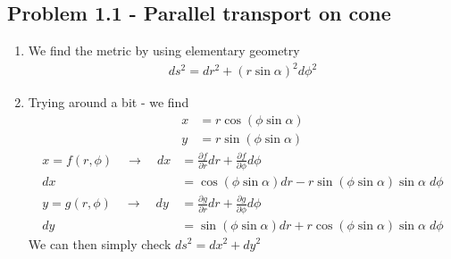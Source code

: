 \documentclass[10pt,a4paper]{book}
\theoremstyle{definition}
\begin{document}
\subsection{Problem 1.1 - Parallel transport on cone}
\begin{enumerate}
\item We find the metric by using elementary geometry
\begin{align}
ds^2 = dr^2+(r\sin\alpha)^2d\phi^2
\end{align}

\item Trying around a bit - we find
\begin{align}
x&=r\cos(\phi \sin\alpha)\\
y&=r\sin(\phi \sin\alpha)
\end{align}
\begin{align}
x=f(r,\phi)\quad\rightarrow\quad dx&=\frac{\partial f}{\partial r}dr+\frac{\partial f}{\partial \phi}d\phi\\
dx&=\cos(\phi\sin\alpha)dr-r\sin(\phi\sin\alpha)\sin\alpha\;d\phi\\
y=g(r,\phi)\quad\rightarrow\quad dy&=\frac{\partial g}{\partial r}dr+\frac{\partial g}{\partial \phi}d\phi\\
dy&=\sin(\phi\sin\alpha)dr+r\cos(\phi\sin\alpha)\sin\alpha\;d\phi
\end{align}
We can then simply check $ds^2=dx^2+dy^2$


\end{enumerate}
\end{document}
